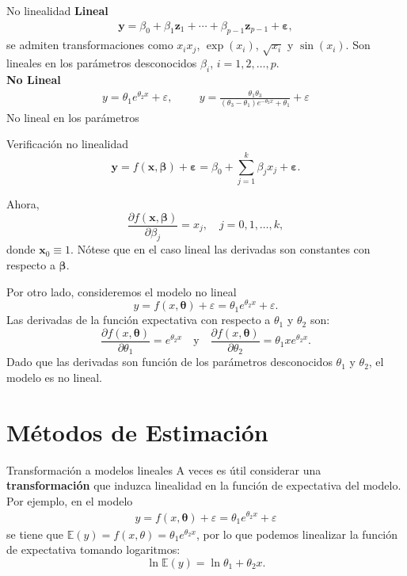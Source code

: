\documentclass[aspectratio = 169, spanish]{beamer}
\newcommand{\E}{\mathbb{E}}
\begin{document}
\begin{frame}{No linealidad}
    \textbf{Lineal}\\
   \begin{align*}
    \bm{y} = \beta_{0} + \beta_{1}\bm{z}_{1} + \cdots + \beta_{p-1}\bm{z}_{p-1} + \bm\varepsilon,
    \end{align*}
    se admiten transformaciones como $x_ix_j$, $\exp(x_i)$, $\sqrt{x_i}$ y $\sin(x_i)$. Son lineales en los parámetros desconocidos $\beta_i$, $i = 1, 2, \ldots, p$.\\
    \vspace{0.5cm}
    \textbf{No Lineal}\\
    \begin{align*}
        y = \theta_1 e^{ \theta_2 x} + \varepsilon, \hspace{1cm} y= \frac{\theta_1 \theta_3}{(\theta_3 - \theta_1) e^{-\theta_2 x} + \theta_1} + \varepsilon
    \end{align*}
    No lineal en los parámetros 
\end{frame}

\begin{frame}{Verificación no linealidad}
    \[
    \bm y = f\left(\bm{x},\bm{\beta}\right) + \bm \varepsilon = \beta_{0} + \sum_{j=1}^{k}\beta_{j}x_{j} + \bm \varepsilon.
\]

Ahora,
\[
\frac{\partial f\left(\bm{x},\bm{\beta}\right)}{\partial\beta_{j}} = x_{j}, \quad j=0,1, \ldots, k,
\]
donde $\bm x_{0} \equiv 1$. Nótese que en el caso lineal las derivadas son constantes con respecto a $\bm{\beta}$.

Por otro lado, consideremos el modelo no lineal
\[
y = f\left(x,\bm{\theta}\right) + \varepsilon = \theta_{1}e^{\theta_{2}x} + \varepsilon.
\]
Las derivadas de la función expectativa con respecto a $\theta_{1}$ y $\theta_{2}$ son:
\[
\frac{\partial f\left(x,\bm{\theta}\right)}{\partial\theta_{1}} = e^{\theta_{2}x} \quad \text{y} \quad \frac{\partial f\left(x,\bm{\theta}\right)}{\partial\theta_{2}} = \theta_{1}xe^{\theta_{2}x}.
\]
Dado que las derivadas son función de los parámetros desconocidos $\theta_{1}$ y $\theta_{2}$, el modelo es no lineal.
\end{frame}


\section{Métodos de Estimación}

\begin{frame}{Transformación a modelos lineales}
A veces es útil considerar una \textbf{transformación} que induzca linealidad en la función de expectativa del modelo. Por ejemplo, en el modelo
\begin{align}\label{linea1}
    y = f(x, \bm\theta) + \varepsilon = \theta_1 e^{\theta_2 x} + \varepsilon
\end{align}
se tiene que $\E(y) = f(x, \theta) = \theta_1 e^{\theta_2 x}$, por lo que podemos linealizar la función de expectativa tomando logaritmos:
\[
\ln \E(y) = \ln \theta_1 + \theta_2 x.
\]
\end{frame}
\end{document}
